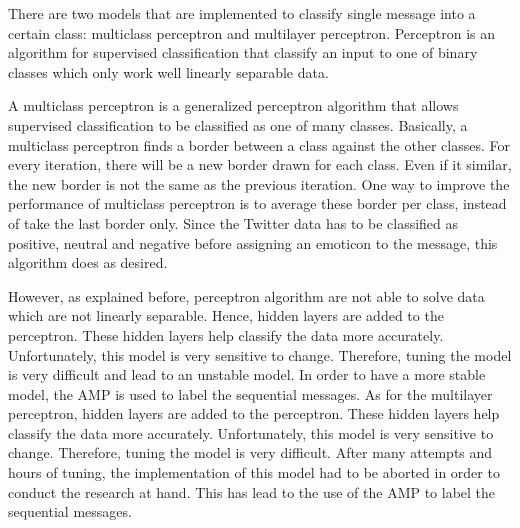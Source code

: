 There are two models that are implemented to classify single message into a certain class: multiclass perceptron and multilayer perceptron.
Perceptron is an algorithm for supervised classification that classify an input to one of binary classes which only work well linearly separable data.

A multiclass perceptron is a generalized perceptron algorithm that allows supervised classification to be classified as one of many classes.
Basically, a multiclass perceptron finds a border between a class against the other classes.
For every iteration, there will be a new border drawn for each class.
Even if it similar, the new border is not the same as the previous iteration.
One way to improve the performance of multiclass perceptron is to average these border per class, instead of take the last border only.
Since the Twitter data has to be classified as positive, neutral and negative before assigning an emoticon to the message, this algorithm does as desired.

However, as explained before, perceptron algorithm are not able to solve data which are not linearly separable.
Hence, hidden layers are added to the perceptron.
These hidden layers help classify the data more accurately.
Unfortunately, this model is very sensitive to change.
Therefore, tuning the model is very difficult and lead to an unstable model.
In order to have a more stable model, the AMP is used to label the sequential messages.
As for the multilayer perceptron, hidden layers are added to the perceptron. These hidden layers help classify the data more accurately. Unfortunately, this model is very sensitive to change. Therefore, tuning the model is very difficult. After many attempts and hours of tuning, the implementation of this model had to be aborted in order to conduct the research at hand. This has lead to the use of the AMP to label the sequential messages.
